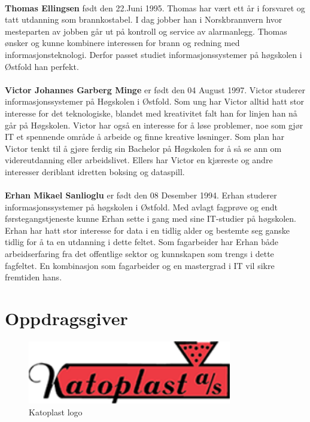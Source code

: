 \paragraph{}\textbf{Thomas Ellingsen} født den 22.Juni 1995. Thomas har vært ett år i forsvaret og tatt utdanning som brannkostabel. I dag jobber han i Norskbrannvern hvor mesteparten av jobben går ut på kontroll og service av alarmanlegg. Thomas ønsker og kunne kombinere interessen for brann og redning med informasjonsteknologi. Derfor passet studiet informasjonssystemer på høgskolen i Østfold han perfekt. 

\paragraph{} \textbf{Victor Johannes Garberg Minge} er født den 04 August 1997. Victor studerer informasjonssystemer på Høgskolen i Østfold. Som ung har Victor alltid hatt stor interesse for det teknologiske, blandet med kreativitet falt han for linjen han nå går på Høgskolen. Victor har også en interesse for å løse problemer, noe som gjør IT et spennende område å arbeide og finne kreative løsninger. Som plan har Victor tenkt til å gjøre ferdig sin Bachelor på Høgskolen for å så se ann om videreutdanning eller arbeidslivet. Ellers har Victor en kjæreste og andre interesser deriblant idretten boksing og dataspill.

\paragraph{} \textbf{Erhan Mikael Sanlioglu} er født den 08 Desember 1994. Erhan studerer informasjonssystemer på høgskolen i Østfold. Med avlagt fagprøve og endt førstegangstjeneste kunne Erhan sette i gang med sine IT-studier på høgskolen. Erhan har hatt stor interesse for data i en tidlig alder og bestemte seg ganske tidlig for å ta en utdanning i dette feltet. Som fagarbeider har Erhan både arbeidserfaring fra det offentlige sektor og kunnskapen som trengs i dette fagfeltet. En kombinasjon som fagarbeider og en mastergrad i IT vil sikre fremtiden hans.

\section{Oppdragsgiver}

\begin{figure}[H]
\centering
\includegraphics[width=3.5in]{Bilder/katoplast_logo.png}
\caption{Katoplast logo}
\end{figure}


